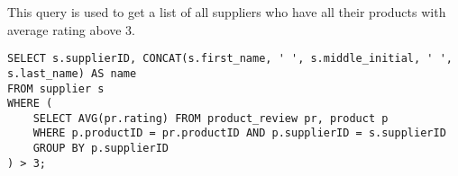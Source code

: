 This query is used to get a list of all suppliers who have all their products with average rating above 3.

\begin{lstlisting}
SELECT s.supplierID, CONCAT(s.first_name, ' ', s.middle_initial, ' ', s.last_name) AS name
FROM supplier s
WHERE (
    SELECT AVG(pr.rating) FROM product_review pr, product p
    WHERE p.productID = pr.productID AND p.supplierID = s.supplierID
    GROUP BY p.supplierID
) > 3;
\end{lstlisting}